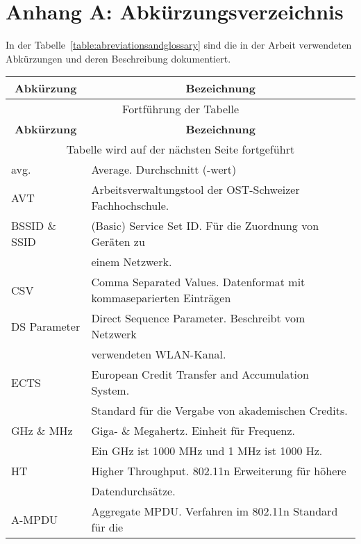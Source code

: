\chapter{Anhang A: Abkürzungsverzeichnis}
In der Tabelle~\ref{table:abreviationsandglossary} sind die in der Arbeit 
verwendeten Abkürzungen und deren Beschreibung dokumentiert.

\clearpage

\begin{longtable}{|l|l|}
    \hline
    \multicolumn{1}{|c|}{\textbf{Abkürzung}} & \multicolumn{1}{c|}{\textbf{Bezeichnung}} \\
    \hline
    \endfirsthead
    \hline 
    \multicolumn{2}{|c|}{{Fortführung der Tabelle}} \\
    \hline
    \multicolumn{1}{|c|}{\textbf{Abkürzung}} & \multicolumn{1}{c|}{\textbf{Bezeichnung}} \\
    \hline 
    \endhead
    \hline 
    \multicolumn{2}{|c|}{{Tabelle wird auf der nächsten Seite fortgeführt}} \\
    \hline
    \endfoot
    \endlastfoot
    avg. & Average. Durchschnitt (-wert) \\
    \hline 
    AVT & Arbeitsverwaltungstool der OST-Schweizer Fachhochschule. \\
    \hline
    BSSID \& SSID & (Basic) Service Set ID. Für die Zuordnung von Geräten zu \\
    & einem Netzwerk. \\
    \hline
    CSV & Comma Separated Values. Datenformat mit kommaseparierten Einträgen \\
    \hline
    DS Parameter & Direct Sequence Parameter. Beschreibt vom Netzwerk \\
    & verwendeten WLAN-Kanal. \\
    \hline
    ECTS & European Credit Transfer and Accumulation System.\\
    & Standard für die Vergabe von akademischen Credits. \\
    \hline
    GHz \& MHz & Giga- \& Megahertz. Einheit für Frequenz. \\ 
    & Ein GHz ist 1000 MHz und 1 MHz ist 1000 Hz. \\
    \hline
    HT & Higher Throughput. 802.11n Erweiterung für höhere \\ 
    & Datendurchsätze. \\
    \hline
    A-MPDU & Aggregate MPDU. Verfahren im 802.11n Standard für die \\

\end{longtable}
